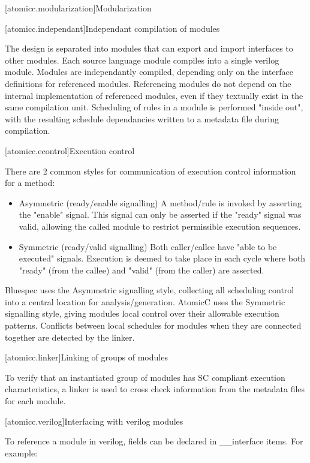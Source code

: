 [atomicc.modularization]{Modularization}

[atomicc.independant]{Independant compilation of modules}

The design is separated into modules that can export and import interfaces to other modules.
Each source language module compiles into a single verilog module.  Modules are independantly
compiled, depending only on the interface definitions for referenced modules.
Referencing modules do not depend on the internal implementation of referenced modules,
even if they textually exist in the same compilation unit.
Scheduling of rules in a module is performed "inside out", with the resulting schedule dependancies written to a metadata file during compilation.

[atomicc.econtrol]{Execution control}

There are 2 common styles for communication of execution control information for a method:
\begin{itemize}
\item Asymmetric (ready/enable signalling)
A method/rule is invoked by asserting the "enable" signal.  This signal can only be
asserted if the "ready" signal was valid, allowing the called module to restrict
permissible execution sequences.

\item Symmetric (ready/valid signalling)
Both caller/callee have "able to be executed" signals.  Execution is deemed to take
place in each cycle where both "ready" (from the callee) and "valid" (from the caller)
are asserted.
\end{itemize}

Bluespec uses the Asymmetric signalling style, collecting all scheduling control into a central location for analysis/generation.
AtomicC uses the Symmetric signalling style, giving modules local control over their allowable execution patterns.  Conflicts between local schedules for modules when they are connected together are detected by the linker.

[atomicc.linker]{Linking of groups of modules}

To verify that an instantiated group of modules has SC compliant execution characteristics, a linker is used to cross check information from the metadata files for each module.

[atomicc.verilog]{Interfacing with verilog modules}

To reference a module in verilog, fields can be declared in __interface items.
For example:


